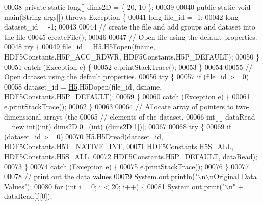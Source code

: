 \begin{DoxyCode}
00038     \textcolor{keyword}{private} \textcolor{keyword}{static} \textcolor{keywordtype}{long}[] dims2D = \{ 20, 10 \};
00039 
00040     \textcolor{keyword}{public} \textcolor{keyword}{static} \textcolor{keywordtype}{void} main(String args[]) \textcolor{keywordflow}{throws} Exception \{
00041         \textcolor{keywordtype}{long} file\_id = -1;
00042         \textcolor{keywordtype}{long} dataset\_id = -1;
00043 
00044         \textcolor{comment}{// create the file and add groups and dataset into the file}
00045         createFile();
00046 
00047         \textcolor{comment}{// Open file using the default properties.}
00048         \textcolor{keywordflow}{try} \{
00049             file\_id = \hyperlink{namespace_h5}{H5}.H5Fopen(fname, HDF5Constants.H5F\_ACC\_RDWR, HDF5Constants.H5P\_DEFAULT);
00050         \}
00051         \textcolor{keywordflow}{catch} (Exception e) \{
00052             e.printStackTrace();
00053         \}
00054 
00055         \textcolor{comment}{// Open dataset using the default properties.}
00056         \textcolor{keywordflow}{try} \{
00057             \textcolor{keywordflow}{if} (file\_id >= 0)
00058                 dataset\_id = \hyperlink{namespace_h5}{H5}.H5Dopen(file\_id, dsname, HDF5Constants.H5P\_DEFAULT);
00059         \}
00060         \textcolor{keywordflow}{catch} (Exception e) \{
00061             e.printStackTrace();
00062         \}
00063 
00064         \textcolor{comment}{// Allocate array of pointers to two-dimensional arrays (the}
00065         \textcolor{comment}{// elements of the dataset.}
00066         \textcolor{keywordtype}{int}[][] dataRead = \textcolor{keyword}{new} \textcolor{keywordtype}{int}[(int) dims2D[0]][(\textcolor{keywordtype}{int}) (dims2D[1])];
00067 
00068         \textcolor{keywordflow}{try} \{
00069             \textcolor{keywordflow}{if} (dataset\_id >= 0)
00070                 \hyperlink{namespace_h5}{H5}.H5Dread(dataset\_id, HDF5Constants.H5T\_NATIVE\_INT,
00071                         HDF5Constants.H5S\_ALL, HDF5Constants.H5S\_ALL,
00072                         HDF5Constants.H5P\_DEFAULT, dataRead);
00073         \}
00074         \textcolor{keywordflow}{catch} (Exception e) \{
00075             e.printStackTrace();
00076         \}
00077 
00078         \textcolor{comment}{// print out the data values}
00079         \hyperlink{namespace_system}{System}.out.println(\textcolor{stringliteral}{"\(\backslash\)n\(\backslash\)nOriginal Data Values"});
00080         \textcolor{keywordflow}{for} (\textcolor{keywordtype}{int} i = 0; i < 20; i++) \{
00081             \hyperlink{namespace_system}{System}.out.print(\textcolor{stringliteral}{"\(\backslash\)n"} + dataRead[i][0]);

\end{DoxyCode}
